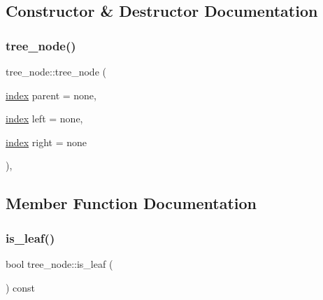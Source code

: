 \subsection{Constructor \& Destructor Documentation}
\mbox{\label{structtree__node_a835de19906d9a6b2f2c8f20345be4839}} 
\subsubsection{\texorpdfstring{tree\+\_\+node()}{tree\_node()}}
{\footnotesize\ttfamily tree\+\_\+node\+::tree\+\_\+node (\begin{DoxyParamCaption}\item[{\hyperlink{tree__gen_8cpp_a7376ecf9f645bcbaa2f0459e17d7588f}{index}}]{parent = {\ttfamily none},  }\item[{\hyperlink{tree__gen_8cpp_a7376ecf9f645bcbaa2f0459e17d7588f}{index}}]{left = {\ttfamily none},  }\item[{\hyperlink{tree__gen_8cpp_a7376ecf9f645bcbaa2f0459e17d7588f}{index}}]{right = {\ttfamily none} }\end{DoxyParamCaption})\hspace{0.3cm}{\ttfamily [inline]}, {\ttfamily [explicit]}}



\subsection{Member Function Documentation}
\mbox{\label{structtree__node_a2c35968103d4326090dcd4b100c1fd56}} 
\subsubsection{\texorpdfstring{is\+\_\+leaf()}{is\_leaf()}}
{\footnotesize\ttfamily bool tree\+\_\+node\+::is\+\_\+leaf (\begin{DoxyParamCaption}{ }\end{DoxyParamCaption}) const\hspace{0.3cm}{\ttfamily [inline]}}

\mbox{\label{structtree__node_acd3e8c452abe8574fbf7b2d1ce52ccfc}} 

